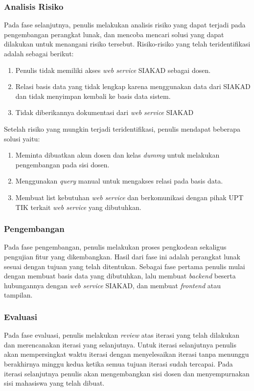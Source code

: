\subsubsection{Analisis Risiko}
	Pada fase selanjutnya, penulis melakukan analisis risiko yang dapat terjadi pada pengembangan perangkat lunak, dan mencoba mencari solusi yang dapat dilakukan untuk menangani risiko tersebut. Risiko-risiko yang telah teridentifikasi adalah sebagai berikut:
\begin{enumerate}
	\item Penulis tidak memiliki akses \textit{web service} SIAKAD sebagai dosen. 
	\item Relasi basis data yang tidak lengkap karena menggunakan data dari SIAKAD dan tidak menyimpan kembali ke basis data sistem.
	\item Tidak diberikannya dokumentasi dari \textit{web service} SIAKAD
\end{enumerate}
Setelah risiko yang mungkin terjadi teridentifikasi, penulis mendapat beberapa solusi yaitu:
\begin{enumerate}
	\item Meminta dibuatkan akun dosen dan kelas \textit{dummy} untuk melakukan pengembangan pada sisi dosen.
	\item Menggunakan \textit{query} manual untuk mengakses relasi pada basis data.
	\item Membuat list kebutuhan \textit{web service} dan berkomunikasi dengan pihak UPT TIK terkait \textit{web service} yang dibutuhkan.
\end{enumerate}

\subsubsection{Pengembangan}
	Pada fase pengembangan, penulis melakukan proses pengkodean sekaligus pengujian fitur yang dikembangkan. Hasil dari fase ini adalah perangkat lunak sesuai dengan tujuan yang telah ditentukan. Sebagai fase pertama penulis mulai dengan membuat basis data yang dibutuhkan, lalu membuat \textit{backend} beserta hubungannya dengan \textit{web service} SIAKAD, dan membuat \textit{frontend} atau tampilan.

\subsubsection{Evaluasi}
	Pada fase evaluasi, penulis melakukan \textit{review} atas iterasi yang telah dilakukan dan merencanakan iterasi yang selanjutnya. Untuk iterasi selanjutnya penulis akan mempersingkat waktu iterasi dengan menyelesaikan iterasi tanpa menunggu berakhirnya minggu kedua ketika semua tujuan iterasi sudah tercapai. Pada iterasi selanjutnya penulis akan mengembangkan sisi dosen dan menyempurnakan sisi mahasiswa yang telah dibuat.

